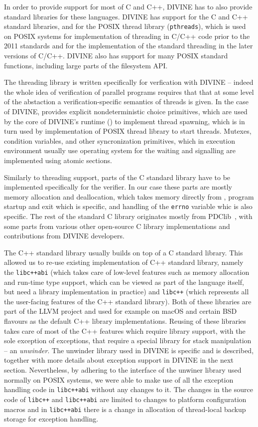 In order to provide support for most of C and C++, DIVINE has to also provide
standard libraries for these languages.
DIVINE has support for the C and C++ standard libraries, and for the POSIX
thread library (\texttt{pthreads}), which is used on POSIX systems for
implementation of threading in C/C++ code prior to the 2011 standards and for
the implementation of the standard threading in the later versions of C/C++.
DIVINE also has support for many POSIX standard functions, including large parts of the filesystem API.

The threading library is written specifically for verfication with DIVINE --
indeed the whole idea of verification of parallel programs requires that that
at some level of the abstaction a verification-specific semantics of threads is
given.
In the case of DIVINE, \divm provides explicit nondeterministic choice
primitives, which are used by the core of DIVINE's runtime (\dios) to implement
thread spawning, which is in turn used by implementation of POSIX thread
library to start threads.
Mutexes, condition variables, and other syncronization primitives, which in
execution environment usually use operating system for the waiting and
signalling are implemented using atomic sections. 

Similarly to threading support, parts of the C standard library have to be
implemented specifically for the verifier.
In our case these parts are mostly memory allocation and deallocation, which
takes memory directly from \divm, program startup and exit which is \dios specific, and handling of the \texttt{errno} variable whic is also \dios specific.
The rest of the standard C library originates mostly from
PDClib~, with some parts from various other open-source C
library implementations and contributions from DIVINE developers.

The C++ standard library usually builds on top of a C standard library.
This allowed us to re-use existing implementation of C++ standard library,
namely the \texttt{libc++abi} (which takes care of low-level features such as
memory allocation and run-time type support, which can be viewed as part of the
language itself, but need a library implementation in practice) and
\texttt{libc++} (which represents all the user-facing features of the C++
standard library).
Both of these libraries are part of the LLVM project and used for example on
macOS and certain BSD flavours as the default C++ library implementations.
Reusing of these libraries takes care of most of the C++ features which require
library support, with the sole exception of exceptions, that require a special
library for stack manipulation -- an \emph{unwinder}.
The unwinder library used in DIVINE is \divm specific and is described,
together with more details about exception support in DIVINE in the next
section.
Nevertheless, by adhering to the interface of the unwiner library used normally
on POSIX systems, we were able to make use of all the exception handling code
in \texttt{libc++abi} without any changes to it.
The changes in the source code of \texttt{libc++} and \texttt{libc++abi} are limited to changes to platform configuration macros and in \texttt{libc++abi} there is a change in allocation of thread-local backup storage for exception handling.


